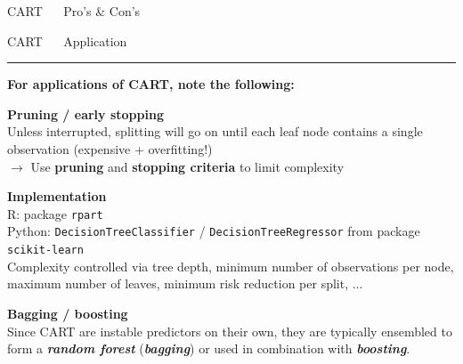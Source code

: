 \documentclass[11pt,compress,t,notes=noshow, xcolor=table]{beamer}
\begin{document}
\begin{frame}{\textcolor{gray!80}{CART} ~~ Pro's \& Con's}
\vfill

\small


\end{frame}


\LARGE
\begin{frame}{\textcolor{gray!80}{CART} ~~ Application}
\normalsize
\vspace{-0.5cm}
\noindent \textcolor{gray!80}{\rule{\textwidth}{1pt}}

\vspace{0.3cm}

\footnotesize

\textbf{For applications of CART, note the following:}
\lz

\textbf{\textcolor{gray!80}{Pruning / early stopping}} \\
\smallskip
Unless interrupted, splitting will go on until each leaf node contains a single 
observation (expensive + overfitting!) \\
\smallskip
$\rightarrow$ Use \textbf{pruning} and \textbf{stopping criteria} to limit 
complexity

\lz
\textbf{\textcolor{gray!80}{Implementation}} \\
\smallskip
R: package \texttt{rpart}\\
Python: \texttt{DecisionTreeClassifier} / \texttt{DecisionTreeRegressor} from 
package \texttt{scikit-learn} \\
Complexity controlled via tree depth, minimum number of observations per 
node, maximum number of leaves, minimum risk reduction per split, ...

\lz
\textbf{\textcolor{gray!80}{Bagging / boosting}} \\
\smallskip
Since CART are instable predictors on their own, they are typically ensembled
to form a \textit{\textbf{random forest}} (\textit{\textbf{bagging}}) or used in 
combination with \textit{\textbf{boosting}}.

\end{frame}

\end{document}
